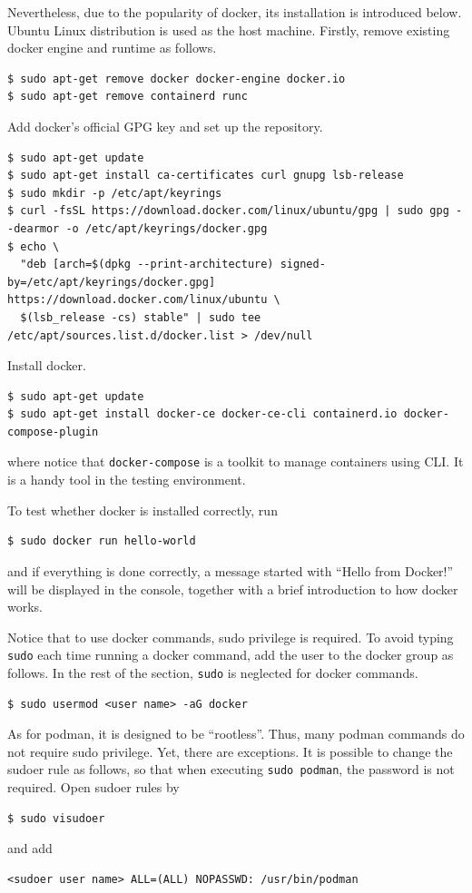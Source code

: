 Nevertheless, due to the popularity of docker, its installation is introduced below. Ubuntu Linux distribution is used as the host machine. Firstly, remove existing docker engine and runtime as follows.
\begin{lstlisting}
$ sudo apt-get remove docker docker-engine docker.io
$ sudo apt-get remove containerd runc
\end{lstlisting}
Add docker's official GPG key and set up the repository.
\begin{lstlisting}
$ sudo apt-get update
$ sudo apt-get install ca-certificates curl gnupg lsb-release
$ sudo mkdir -p /etc/apt/keyrings
$ curl -fsSL https://download.docker.com/linux/ubuntu/gpg | sudo gpg --dearmor -o /etc/apt/keyrings/docker.gpg
$ echo \
  "deb [arch=$(dpkg --print-architecture) signed-by=/etc/apt/keyrings/docker.gpg] https://download.docker.com/linux/ubuntu \
  $(lsb_release -cs) stable" | sudo tee /etc/apt/sources.list.d/docker.list > /dev/null
\end{lstlisting}
Install docker.
\begin{lstlisting}
$ sudo apt-get update
$ sudo apt-get install docker-ce docker-ce-cli containerd.io docker-compose-plugin
\end{lstlisting}
where notice that \verb|docker-compose| is a toolkit to manage containers using CLI. It is a handy tool in the testing environment.

To test whether docker is installed correctly, run
\begin{lstlisting}
$ sudo docker run hello-world
\end{lstlisting}
and if everything is done correctly, a message started with ``Hello from Docker!'' will be displayed in the console, together with a brief introduction to how docker works.

Notice that to use docker commands, sudo privilege is required. To avoid typing \verb|sudo| each time running a docker command, add the user to the docker group as follows. In the rest of the section, \verb|sudo| is neglected for docker commands.
\begin{lstlisting}
$ sudo usermod <user name> -aG docker
\end{lstlisting}
As for podman, it is designed to be ``rootless''. Thus, many podman commands do not require sudo privilege. Yet, there are exceptions. It is possible to change the sudoer rule as follows, so that when executing \verb|sudo podman|, the password is not required. Open sudoer rules by
\begin{lstlisting}
$ sudo visudoer
\end{lstlisting}
and add
\begin{lstlisting}
<sudoer user name> ALL=(ALL) NOPASSWD: /usr/bin/podman
\end{lstlisting}

